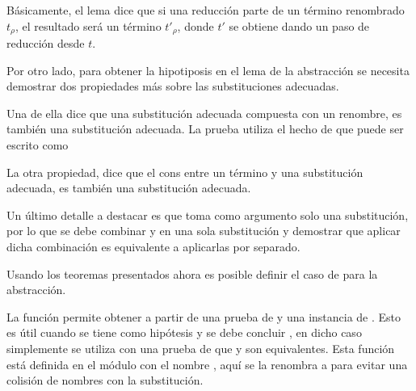 Básicamente, el lema dice que si una reducción parte de un término renombrado $t_\rho$, el resultado será un término $t'_\rho$, donde $t'$ se obtiene dando un paso de reducción desde $t$.
\fi

Por otro lado, para obtener la hipotiposis  en el lema de la abstracción se necesita demostrar dos propiedades más sobre las substituciones adecuadas.

Una de ella dice que una substitución adecuada compuesta con un renombre, es también una substitución adecuada.
La prueba utiliza el hecho de que   puede ser escrito como
\subst{\comp{\ids}{\bound{$\rho$}}}{}


La otra propiedad, dice que el cons entre un término \snstar y una substitución adecuada, es también una substitución adecuada.


Un último detalle a destacar es que  toma como argumento solo una substitución, por lo que se debe combinar \bound{$\sigma$} y
en una sola substitución y demostrar que aplicar dicha combinación es equivalente a aplicarlas por separado.



Usando los teoremas presentados ahora es posible definir el caso de  para la abstracción.

\begin{samepage}
\end{samepage}

La función  permite obtener  a partir de una prueba de  \type{$\cong$}  y una instancia de .
Esto es útil cuando se tiene como hipótesis \snstar {} y se debe concluir \snstar {}, en dicho caso simplemente se utiliza  con una prueba de que  y  son equivalentes.
Esta función está definida en el módulo  con el nombre , aquí se la renombra a  para evitar una colisión de nombres con la substitución.

